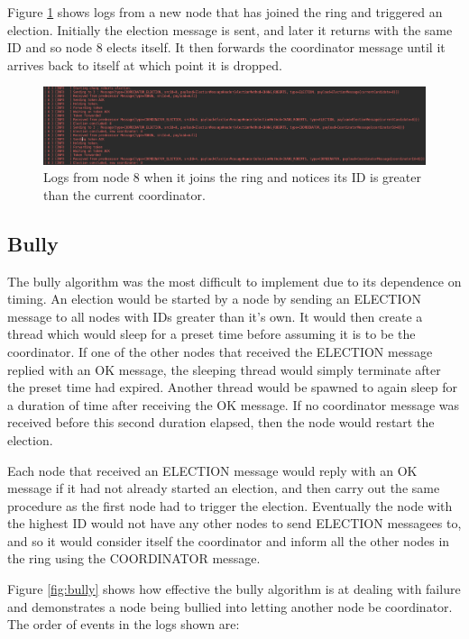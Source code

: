 \documentclass[12pt]{article}
\begin{document}
Figure \ref{fig:chang} shows logs from a new node that has joined the ring and triggered an election. Initially the election message is sent, and later it returns with the same ID and so node 8 elects itself. It then forwards the coordinator message until it arrives back to itself at which point it is dropped.

\begin{figure}[!ht]
	\centering
	\includegraphics[width=\linewidth]{images/chang}
	\caption{Logs from node 8 when it joins the ring and notices its ID is greater than the current coordinator.}
	\label{fig:chang}
\end{figure}

\subsection{Bully}

The bully algorithm was the most difficult to implement due to its dependence on timing. An election would be started by a node by sending an ELECTION message to all nodes with IDs greater than it's own. It would then create a thread which would sleep for a preset time before assuming it is to be the coordinator. If one of the other nodes that received the ELECTION message replied with an OK message, the sleeping thread would simply terminate after the preset time had expired. Another thread would be spawned to again sleep for a duration of time after receiving the OK message. If no coordinator message was received before this second duration elapsed, then the node would restart the election.

Each node that received an ELECTION message would reply with an OK message if it had not already started an election, and then carry out the same procedure as the first node had to trigger the election. Eventually the node with the highest ID would not have any other nodes to send ELECTION messagees to, and so it would consider itself the coordinator and inform all the other nodes in the ring using the COORDINATOR message.

Figure \ref{fig:bully} shows how effective the bully algorithm is at dealing with failure and demonstrates a node being bullied into letting another node be coordinator. The order of events in the logs shown are:
\end{document}
